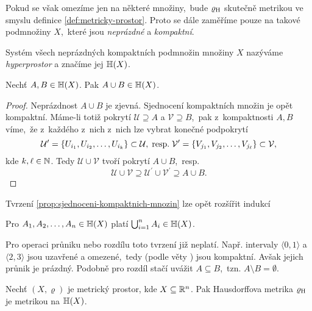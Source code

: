 Pokud se však omezíme jen na některé množiny,~bude $\varrho_\textup{H}$ skutečně metrikou ve smyslu definice \ref{def:metricky-prostor}. Proto se dále zaměříme pouze na takové podmnožiny $X$,~které jsou \emph{neprázdné} a \emph{kompaktní}.
\begin{definition}[Hyperprostor]\label{def:hyperprostor}
    Systém všech neprázdných kompaktních podmnožin množiny $X$ nazýváme \emph{hyperprostor} a značíme jej $\mathbb{H}(X)$.
\end{definition}
\begin{proposition}\label{prop:sjednoceni-kompaktnich-mnozin}
    Nechť $A,B\in\mathbb{H}(X)$. Pak $A\cup B\in\mathbb{H}(X)$.
\end{proposition}
\begin{proof}
    Neprázdnost $A\cup B$ je zjevná. Sjednocení kompaktních množin je opět kompaktní. Máme-li totiž pokrytí $\mathcal{U}\supseteq A$ a $\mathcal{V}\supseteq B$,~pak z~kompaktnosti $A,B$ víme,~že z~každého z~nich z~nich lze vybrat konečné podpokrytí
    \[\mathcal{U}^\prime=\left\{U_{i_1},U_{i_2},\ldots,U_{i_k}\right\}\subset\mathcal{U},\;\text{resp.}\;\mathcal{V}^\prime=\left\{V_{j_1},V_{j_2},\ldots,V_{j_\ell}\right\}\subset\mathcal{V},\]
    kde $k,\ell\in\mathbb{N}$. Tedy $\mathcal{U}\cup\mathcal{V}$ tvoří pokrytí $A\cup B$,~resp.
    \[\mathcal{U}\cup\mathcal{V}\supseteq\mathcal{U}^\prime\cup\mathcal{V}^\prime\supseteq A\cup B.\]
\end{proof}
Tvrzení \ref{prop:sjednoceni-kompaktnich-mnozin} lze opět rozšířit indukcí
\begin{corollary}\label{cor:sjednoceni-n-kompaktnich-mnozin}
    Pro $A_1,A_2,\ldots,A_n\in\mathbb{H}(X)$ platí $\bigcup_{i=1}^n A_i\in\mathbb{H}(X)$.
\end{corollary}
Pro operaci průniku nebo rozdílu toto tvrzení již neplatí. Např. intervaly $\langle0,1\rangle$ a $\langle2,3\rangle$ jsou uzavřené a omezené,~tedy (podle věty ) jsou kompaktní. Avšak jejich průnik je prázdný. Podobně pro rozdíl stačí uvážit $A\subseteq B$,~tzn. $A\setminus B=\emptyset$.
\begin{theorem}\label{thm:hausdorffova-metrika-je-metrika}
    Nechť $(X,\varrho)$ je metrický prostor, kde $X\subseteq\mathbb{R}^n$. Pak Hausdorffova metrika $\varrho_\textup{H}$ je metrikou na $\mathbb{H}(X)$.
\end{theorem}
